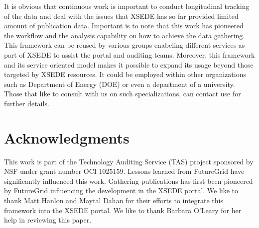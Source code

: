 \documentclass{sig-alternate}
\begin{document}
It is obvious that continuous work is important to conduct
longitudinal tracking of the data and deal with the issues that XSEDE
has so far provided limited amount of publication data. Important is
to note that this work has pioneered the workflow and the analysis
capability on how to achieve the data gathering. This framework can be
reused by various groups enabeling different services as part of
XSEDE to assist the portal and auditing teams. Moreover, this
framework and its service oriented model makes it possible to expand
its usage beyond those targeted by XSEDE resources. It could be
employed within other organizations such as Department of Energy (DOE)
or even a department of a university. Those that like to consult with
us on such specializations, can contact use for further details.


\section{Acknowledgments}

 
This work is part of the Technology Auditing Service (TAS) project
sponsored by NSF under grant number OCI 1025159. Lessons learned from
FutureGrid have significantly influenced this work. Gathering
publications has first been pioneered by FutureGrid influencing the
development in the XSEDE portal. We like to thank Matt Hanlon and
Maytal Dahan for their efforts to integrate this framework into the
XSEDE portal. We like to thank Barbara O'Leary for her help in
reviewing this paper.
 
%
%
 
 

\end{document}
